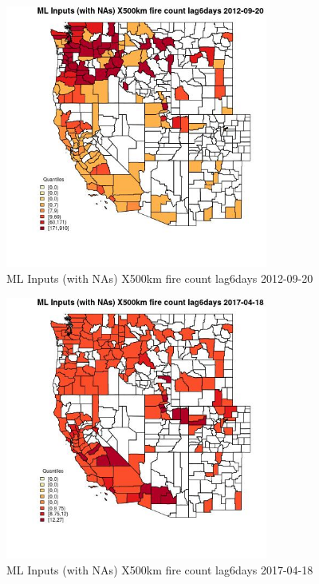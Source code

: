 \begin{figure} 
\centering  
\includegraphics[width=0.77\textwidth]{Code_Outputs/Report_ML_input_PM25_Step4_part_e_de_duplicated_aves_compiled_2019-05-14wNAs_CountyX500km_fire_count_lag6daysMean2012-09-20_2012-09-20.jpg} 
\caption{\label{fig:Report_ML_input_PM25_Step4_part_e_de_duplicated_aves_compiled_2019-05-14wNAsCountyX500km_fire_count_lag6daysMean2012-09-20_2012-09-20}ML Inputs (with NAs) X500km fire count lag6days 2012-09-20} 
\end{figure} 
 

\begin{figure} 
\centering  
\includegraphics[width=0.77\textwidth]{Code_Outputs/Report_ML_input_PM25_Step4_part_e_de_duplicated_aves_compiled_2019-05-14wNAs_CountyX500km_fire_count_lag6daysMean2017-04-18_2017-04-18.jpg} 
\caption{\label{fig:Report_ML_input_PM25_Step4_part_e_de_duplicated_aves_compiled_2019-05-14wNAsCountyX500km_fire_count_lag6daysMean2017-04-18_2017-04-18}ML Inputs (with NAs) X500km fire count lag6days 2017-04-18} 
\end{figure} 
 

